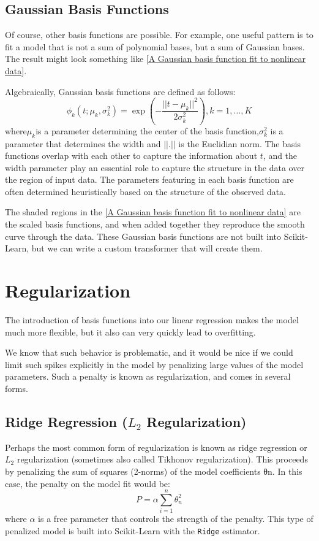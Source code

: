 \subsection*{Gaussian Basis Functions}
Of course, other basis functions are possible. For example, one useful pattern is to fit a model that is not a sum of polynomial bases, but a sum of Gaussian bases. The result might look something like \autoref{A Gaussian basis function fit to nonlinear data}.

Algebraically, Gaussian basis functions are defined as follows:
\begin{equation}
    \phi_k(t;\mu_k ,\sigma^2_k) = \exp \left(-\dfrac{||t-\mu_k||^2}{2\sigma^2_k}\right), k=1,\dots,K
\end{equation}
where$\mu_k$is a parameter determining the center of the basis function,$\sigma_k^2$
is a parameter that determines the width and $||.||$ is the Euclidian norm. The basis functions overlap with each other to capture the information about $t$, and the width parameter play an essential role to capture the structure in the data over the region of input data. The parameters featuring in each basis function are often determined heuristically based on the structure of the observed data.


The shaded regions in the \autoref{A Gaussian basis function fit to nonlinear data} are the scaled basis functions, and when added together they reproduce the smooth curve through the data. These Gaussian basis functions are not built into Scikit-Learn, but we can write a custom transformer that
will create them.

\section{Regularization}
The introduction of basis functions into our linear regression makes the model much more flexible, but it also can very quickly lead to overfitting.

We know that such
behavior is problematic, and it would be nice if we could limit such spikes explicitly
in the model by penalizing large values of the model parameters. Such a penalty is
known as regularization, and comes in several forms.

\subsection*{Ridge Regression ($L_2$ Regularization)}
Perhaps the most common form of regularization is known as ridge regression or $L_2$ regularization (sometimes also called Tikhonov regularization). This proceeds by penalizing the sum of squares (2-norms) of the model coefficients θn. In this case, the
penalty on the model fit would be:
\begin{equation}
    P=\alpha\sum_{i=1}^{n}\theta_n^2
\end{equation}
where $\alpha$ is a free parameter that controls the strength of the penalty. This type of penalized model is built into Scikit-Learn with the \verb|Ridge| estimator.

